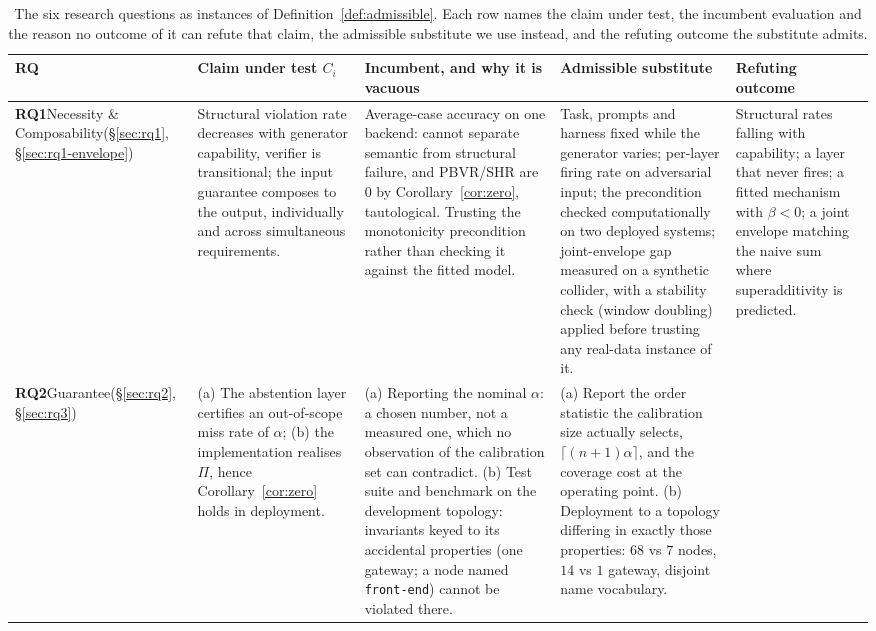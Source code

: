 \documentclass[journal, 10pt]{IEEEtran}
\begin{document}
\begin{table}[!t]
\centering
\caption{The six research questions as instances of Definition~\ref{def:admissible}. Each row names the claim under test, the incumbent evaluation and the reason no outcome of it can refute that claim, the admissible substitute we use instead, and the refuting outcome the substitute admits.}
\label{tab:rq-spine}
\footnotesize
\setlength{\tabcolsep}{4pt}
\begin{tabular}{p{1.5cm}p{3.2cm}p{4.2cm}p{3.9cm}p{3.5cm}}
\toprule
\textbf{RQ} & \textbf{Claim under test $C_i$} & \textbf{Incumbent, and why it is vacuous} & \textbf{Admissible substitute} & \textbf{Refuting outcome} \\
\midrule
\textbf{RQ1}\newline Necessity \& Composability\newline (\S\ref{sec:rq1}, \S\ref{sec:rq1-envelope})
& Structural violation rate decreases with generator capability, verifier is transitional; the input guarantee composes to the output, individually and across simultaneous requirements.
& Average-case accuracy on one backend: cannot separate semantic from structural failure, and PBVR/SHR are $0$ by Corollary~\ref{cor:zero}, tautological. Trusting the monotonicity precondition rather than checking it against the fitted model.
& Task, prompts and harness fixed while the generator varies; per-layer firing rate on adversarial input; the precondition checked computationally on two deployed systems; joint-envelope gap measured on a synthetic collider, with a stability check (window doubling) applied before trusting any real-data instance of it.
& Structural rates falling with capability; a layer that never fires; a fitted mechanism with $\beta{<}0$; a joint envelope matching the naive sum where superadditivity is predicted. \\
\addlinespace
\textbf{RQ2}\newline Guarantee\newline (\S\ref{sec:rq2}, \S\ref{sec:rq3})
& (a) The abstention layer certifies an out-of-scope miss rate of $\alpha$; (b) the implementation realises $\Pi$, hence Corollary~\ref{cor:zero} holds in deployment.
& (a) Reporting the nominal $\alpha$: a chosen number, not a measured one, which no observation of the calibration set can contradict. (b) Test suite and benchmark on the development topology: invariants keyed to its accidental properties (one gateway; a node named \texttt{front-end}) cannot be violated there.
& (a) Report the order statistic the calibration size actually selects, $\lceil (n{+}1)\alpha\rceil$, and the coverage cost at the operating point. (b) Deployment to a topology differing in exactly those properties: $68$ vs $7$ nodes, $14$ vs $1$ gateway, disjoint name vocabulary.

\end{tabular}
\end{table}
\end{document}
